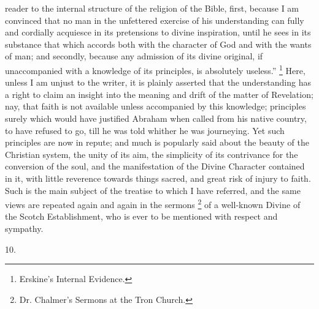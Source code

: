 reader to the internal structure of the religion of the Bible,
first, because I am convinced that no man in the unfettered exercise
of his understanding can fully and cordially acquiesce in its
pretensions to divine inspiration, until he sees in its substance that
which accords both with the character of God and with the wants of
man; and secondly, because any admission of its divine original, if
unaccompanied with a knowledge of its principles, is absolutely
useless.'' \footnote{Erskine's Internal Evidence.} Here,
unless I am unjust to the writer, it is plainly asserted that the
understanding has a right to claim an insight into the meaning and
drift of the matter of Revelation; nay, that faith is not available
unless accompanied by this knowledge; principles surely which would
have justified Abraham when called from his native country, to have
refused to go, till he was told whither he was journeying. Yet such
principles are now in repute; and much is popularly said about the
beauty of the Christian system, the unity of its aim, the simplicity
of its contrivance for the conversion of the soul, and the
manifestation of the Divine Character contained in it, with little
reverence towards things sacred, and great risk of injury to faith.
Such is the main subject of the treatise to which I have referred, and
the same views are repeated again and again in the sermons \footnote{Dr. Chalmer's Sermons at the Tron Church.} of a well-known Divine of the Scotch Establishment, who is
ever to be mentioned with respect and sympathy.

10.


